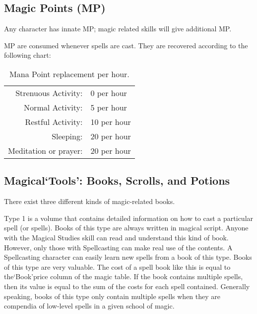 \documentclass[twoside]{book}
\begin{document}
\subsection{Magic Points (MP)}
    
    {  
    Any character has innate MP; magic related skills will give additional MP.
    }
  
    {  
    MP are consumed whenever spells are cast. They are recovered according to the following chart:
    }
  
\begin{table}[!htb]
  \begin{center}

  \begin{tabular}{|r|l|}
  \hline
\textscbf{} &\textscbf{} \\
  \hline
  \hline
      Strenuous Activity:&0 per hour\\
\hline
Normal Activity:&5 per hour\\
\hline
Restful Activity:&10 per hour\\
\hline
Sleeping:&20 per hour\\
\hline
Meditation or prayer:&20 per hour\\
\hline

  \end{tabular}
  
\caption{Mana Point replacement per hour.}
  
  \end{center}
\end{table}
  
    

\subsection{Magical`Tools': Books, Scrolls, and Potions}
    
    {  
    There exist three different kinds of magic-related books.
    }
  
    {  
    Type 1 is a volume that contains detailed information on how to cast a particular spell (or spells). Books of this type are always written in magical script. Anyone with the Magical Studies skill can read and understand this kind of book. However, only those with Spellcasting can make real use of the contents. A Spellcasting character can easily learn new spells from a book of this type. Books of this type are very valuable. The cost of a spell book like this is equal to the`Book'price column of the magic table. If the book contains multiple spells, then its value is equal to the sum of the costs for each spell contained. Generally speaking, books of this type only contain multiple spells when they are compendia of low-level spells in a given school of magic.
    }
  
\end{document}
